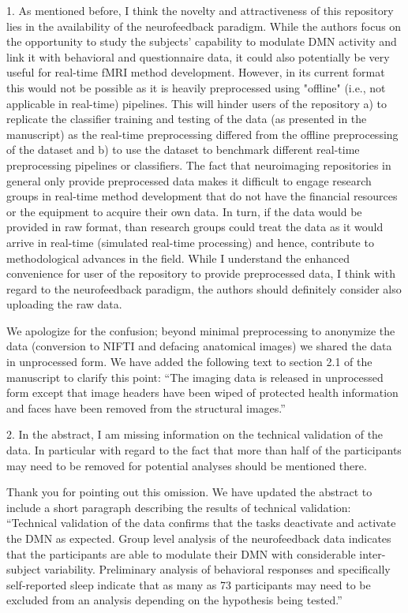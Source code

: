 \documentclass{article}
\newcommand{\RESPONSE}[1]{\textcolor{responseblue}{#1}}
\begin{document}
1. As mentioned before, I think the novelty and attractiveness of this repository lies in the availability of the neurofeedback paradigm. While the authors focus on the opportunity to study the subjects' capability to modulate DMN activity and link it with behavioral and questionnaire data, it could also potentially be very useful for real-time fMRI method development. However, in its current format this would not be possible as it is heavily preprocessed using "offline" (i.e., not applicable in real-time) pipelines. This will hinder users of the repository a) to replicate the classifier training and testing of the data (as presented in the manuscript) as the real-time preprocessing differed from the offline preprocessing of the dataset and b) to use the dataset to benchmark different real-time preprocessing pipelines or classifiers. The fact that neuroimaging repositories in general only provide preprocessed data makes it difficult to engage research groups in real-time method development that do not have the financial resources or the equipment to acquire their own data. In turn, if the data would be provided in raw format, than research groups could treat the data as it would arrive in real-time (simulated real-time processing) and hence, contribute to methodological advances in the field. While I understand the enhanced convenience for user of the repository to provide preprocessed data, I think with regard to the neurofeedback paradigm, the authors should definitely consider also uploading the raw data.

\RESPONSE{We apologize for the confusion; beyond minimal preprocessing to anonymize the data (conversion to NIFTI and defacing anatomical images) we shared the data in unprocessed form. We have added the following text to section 2.1 of the manuscript to clarify this point: ``The imaging data is released in unprocessed form except that image headers have been wiped of protected health information and faces have been removed from the structural images.''}

2. In the abstract, I am missing information on the technical validation of the data. In particular with regard to the fact that more than half of the participants may need to be removed for potential analyses should be mentioned there.

\RESPONSE{Thank you for pointing out this omission. We have updated the abstract to include a short paragraph describing the results of technical validation: ``Technical validation of the data confirms that the tasks deactivate and activate the DMN as expected. Group level analysis of the neurofeedback data indicates that the participants are able to modulate their DMN with considerable inter-subject variability. Preliminary analysis of behavioral responses and specifically self-reported sleep indicate that as many as 73 participants may need to be excluded from an analysis depending on the hypothesis being tested.''}
\end{document}
